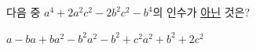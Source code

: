 다음 중 $a^4+2a^2c^2-2b^2c^2-b^4$의 인수가 \underline{아닌} 것은?
\begin{choices32}{$a-b$}{$a+b$}{$a^2-b^2$}{$a^2-b^2+c^2$}{$a^2+b^2+2c^2$}\end{choices32}
